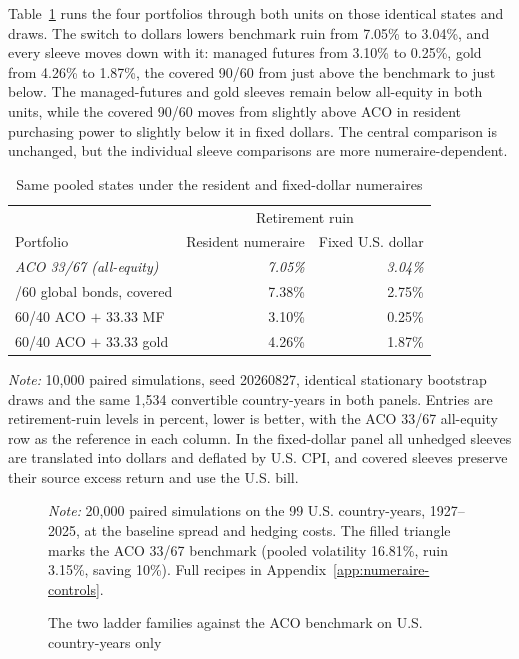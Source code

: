 \documentclass[11pt]{article}
\begin{document}
Table~\ref{tab:usd-numeraire} runs the four portfolios through both units on
those identical states and draws. The switch to dollars lowers benchmark ruin
from 7.05\% to 3.04\%, and every sleeve moves down with it: managed futures
from 3.10\% to 0.25\%, gold from 4.26\% to 1.87\%, the covered 90/60 from just
above the benchmark to just below. The managed-futures and gold sleeves remain
below all-equity in both units, while the covered 90/60 moves from slightly
above ACO in resident purchasing power to slightly below it in fixed dollars.
The central comparison is unchanged, but the individual sleeve comparisons are
more numeraire-dependent.

\begin{table}[H]
\centering
\caption{Same pooled states under the resident and fixed-dollar numeraires}
\label{tab:usd-numeraire}
\setlength{\tabcolsep}{6pt}
\small
\begin{tabular}{lrr}
\toprule
& \multicolumn{2}{c}{Retirement ruin} \\
Portfolio & Resident numeraire & Fixed U.S. dollar \\
\midrule
\emph{ACO 33/67 (all-equity)} & \emph{7.05\%} & \emph{3.04\%} \\
\addlinespace
90/60 global bonds, covered & 7.38\% & 2.75\% \\
60/40 ACO $+$ 33.33 MF & 3.10\% & 0.25\% \\
60/40 ACO $+$ 33.33 gold & 4.26\% & 1.87\% \\
\bottomrule
\end{tabular}
\begin{minipage}{0.94\textwidth}\footnotesize
\textit{Note:} 10,000 paired simulations, seed 20260827, identical stationary
bootstrap draws and the same 1{,}534 convertible country-years in both panels.
Entries are retirement-ruin levels in percent, lower is better, with the
ACO 33/67 all-equity row as the reference in each column. In the fixed-dollar
panel all unhedged sleeves are translated into dollars and deflated by U.S.
CPI, and covered sleeves preserve their source excess return and use the U.S.
bill.
\end{minipage}
\end{table}

\begin{figure}[t]
\centering

\caption{The two ladder families against the ACO benchmark on U.S. country-years only}
\label{fig:ladders-usa}
\begin{minipage}{0.9\textwidth}\footnotesize
\textit{Note:} 20,000 paired simulations on the 99 U.S. country-years,
1927--2025, at the baseline spread and hedging costs. The filled triangle marks
the ACO 33/67 benchmark (pooled volatility 16.81\%, ruin 3.15\%, saving 10\%).
Full recipes in Appendix~\ref{app:numeraire-controls}.
\end{minipage}
\end{figure}
\end{document}
